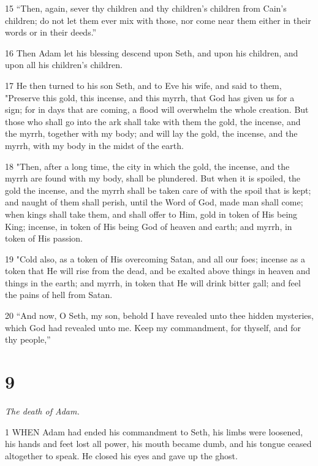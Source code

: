 \par 15 “Then, again, sever thy children and thy children's children from Cain's children; do not let them ever mix with those, nor come near them either in their words or in their deeds.”

\par 16 Then Adam let his blessing descend upon Seth, and upon his children, and upon all his children's children.

\par 17 He then turned to his son Seth, and to Eve his wife, and said to them, "Preserve this gold, this incense, and this myrrh, that God has given us for a sign; for in days that are coming, a flood will overwhelm the whole creation. But those who shall go into the ark shall take with them the gold, the incense, and the myrrh, together with my body; and will lay the gold, the incense, and the myrrh, with my body in the midst of the earth.

\par 18 "Then, after a long time, the city in which the gold, the incense, and the myrrh are found with my body, shall be plundered. But when it is spoiled, the gold the incense, and the myrrh shall be taken care of with the spoil that is kept; and naught of them shall perish, until the Word of God, made man shall come; when kings shall take them, and shall offer to Him, gold in token of His being King; incense, in token of His being God of heaven and earth; and myrrh, in token of His passion.

\par 19 "Cold also, as a token of His overcoming Satan, and all our foes; incense as a token that He will rise from the dead, and be exalted above things in heaven and things in the earth; and myrrh, in token that He will drink bitter gall; and feel the pains of hell from Satan.

\par 20 “And now, O Seth, my son, behold I have revealed unto thee hidden mysteries, which God had revealed unto me. Keep my commandment, for thyself, and for thy people,”

\chapter{9}

\par \textit{The death of Adam.}

\par 1 WHEN Adam had ended his commandment to Seth, his limbs were loosened, his hands and feet lost all power, his mouth became dumb, and his tongue ceased altogether to speak. He closed his eyes and gave up the ghost.

